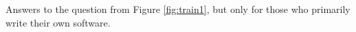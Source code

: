 \label{fig:crosstrain}

Answers to the question from Figure \ref{fig:train1}, but only for those who primarily write their own software.
  